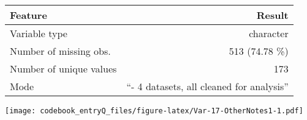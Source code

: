 \documentclass[]{article}
\newcommand{\bminione}{\begin{minipage}{0.75 \textwidth}}
\newcommand{\bminitwo}{\begin{minipage}{0.25 \textwidth}}
\newcommand{\emini}{\end{minipage}}
\begin{document}
\bminione

\begin{longtable}[]{@{}lr@{}}
\toprule
\begin{minipage}[b]{0.34\columnwidth}\raggedright\strut
Feature\strut
\end{minipage} & \begin{minipage}[b]{0.55\columnwidth}\raggedleft\strut
Result\strut
\end{minipage}\tabularnewline
\midrule
\endhead
\begin{minipage}[t]{0.34\columnwidth}\raggedright\strut
Variable type\strut
\end{minipage} & \begin{minipage}[t]{0.55\columnwidth}\raggedleft\strut
character\strut
\end{minipage}\tabularnewline
\begin{minipage}[t]{0.34\columnwidth}\raggedright\strut
Number of missing obs.\strut
\end{minipage} & \begin{minipage}[t]{0.55\columnwidth}\raggedleft\strut
513 (74.78 \%)\strut
\end{minipage}\tabularnewline
\begin{minipage}[t]{0.34\columnwidth}\raggedright\strut
Number of unique values\strut
\end{minipage} & \begin{minipage}[t]{0.55\columnwidth}\raggedleft\strut
173\strut
\end{minipage}\tabularnewline
\begin{minipage}[t]{0.34\columnwidth}\raggedright\strut
Mode\strut
\end{minipage} & \begin{minipage}[t]{0.55\columnwidth}\raggedleft\strut
``- 4 datasets, all cleaned for analysis''\strut
\end{minipage}\tabularnewline
\bottomrule
\end{longtable}

\emini
\bminitwo
\texttt{[image: codebook\_entryQ\_files/figure-latex/Var-17-OtherNotes1-1.pdf]}
\emini
\end{document}
